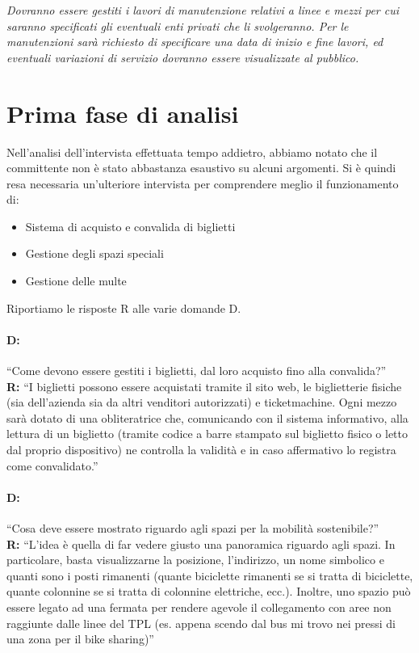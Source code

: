 \documentclass[12pt,a4paper]{report}
\begin{document}
\textit{Dovranno essere gestiti i lavori di manutenzione relativi a linee e mezzi per cui saranno specificati gli eventuali enti privati che li svolgeranno. Per le manutenzioni sarà richiesto di specificare una data di inizio e fine lavori, ed eventuali variazioni di servizio dovranno essere visualizzate al pubblico.}


\section{Prima fase di analisi}
Nell’analisi dell’intervista effettuata tempo addietro, abbiamo notato che il committente non è stato abbastanza esaustivo su alcuni argomenti.
Si è quindi resa necessaria un’ulteriore intervista per comprendere meglio il funzionamento di:
\begin{itemize}
	\item Sistema di acquisto e convalida di biglietti
	\item Gestione degli spazi speciali
	\item Gestione delle multe
\end{itemize}
\noindent Riportiamo le risposte R alle varie domande D.

\paragraph{D:}
“Come devono essere gestiti i biglietti, dal loro acquisto fino alla convalida?”
\\ {\bf R:} “I biglietti possono essere acquistati tramite il sito web, le biglietterie fisiche (sia dell’azienda sia da altri venditori autorizzati) e ticketmachine.
Ogni mezzo sarà dotato di una obliteratrice che, comunicando con il sistema informativo, alla lettura di un biglietto (tramite codice a barre stampato sul biglietto fisico o letto dal proprio dispositivo) ne controlla la validità e in caso affermativo lo registra come convalidato.”

\paragraph{D:}
“Cosa deve essere mostrato riguardo agli spazi per la mobilità sostenibile?”
\\ {\bf R:} “L’idea è quella di far vedere giusto una panoramica riguardo agli spazi.
In particolare, basta visualizzarne la posizione, l’indirizzo, un nome simbolico e quanti sono i posti rimanenti (quante biciclette rimanenti se si tratta di biciclette, quante colonnine se si tratta di colonnine elettriche, ecc.).
Inoltre, uno spazio può essere legato ad una fermata per rendere agevole il collegamento con aree non raggiunte dalle linee del TPL (es. appena scendo dal bus mi trovo nei pressi di una zona per il bike sharing)”
\end{document}
